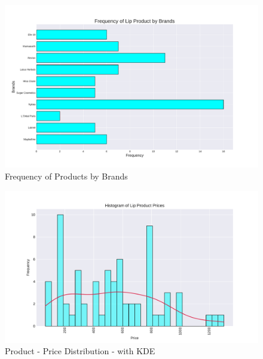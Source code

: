 \documentclass{article}
\begin{document}
\begin{center}
    \begin{figure}[htbp]
        \centering
        \includegraphics[scale=0.5]{../images/India-graphs/Brand_Frequency.pdf}
        \caption{Frequency of Products by Brands}
        \label{Products_by_Brands_ind}
    \end{figure}

    \begin{figure}[htbp]
        \centering
        \includegraphics[scale=0.6]{../images/India-graphs/KDE_Prices.pdf}
        \caption{Product - Price Distribution - with KDE}
        \label{KDE_Prices_ind}
    \end{figure}


\end{center}
\end{document}
